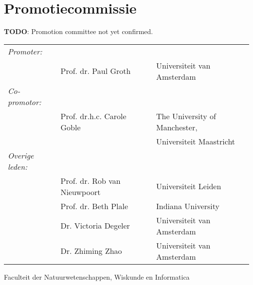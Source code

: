 \newpage

\section*{Promotiecommissie}

\textbf{TODO}: Promotion committee not yet confirmed.

\begin{tabular}{lll}
\textit{Promoter:}  &  & \\
     & Prof. dr. Paul Groth     & Universiteit van Amsterdam \\
\textit{Co-promotor:} & & \\     
     &  Prof. dr.h.c. Carole Goble & The University of Manchester, \\
     &                          & Universiteit Maastricht \\
\textit{Overige leden:} & & \\
     &  Prof. dr. Rob van Nieuwpoort   & Universiteit Leiden \\
     &  Prof. dr. Beth Plale     & Indiana University  \\     
     &  Dr. Victoria Degeler     & Universiteit van Amsterdam \\
     &  Dr. Zhiming Zhao         & Universiteit van Amsterdam  \\     
\end{tabular}

Faculteit der Natuurwetenschappen, Wiskunde en Informatica
